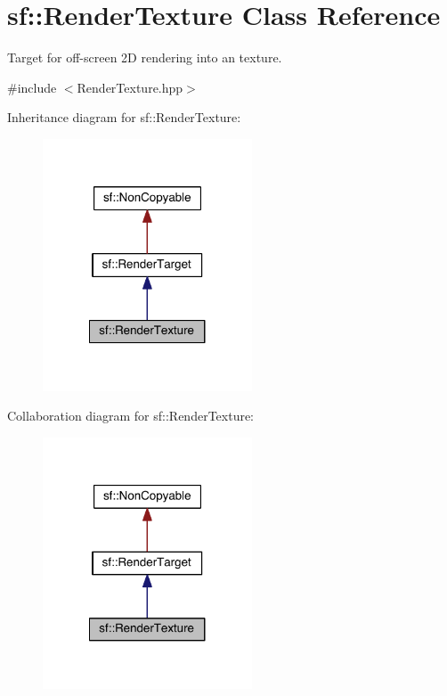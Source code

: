 \hypertarget{classsf_1_1_render_texture}{\section{sf\-:\-:Render\-Texture Class Reference}
\label{classsf_1_1_render_texture}
}


Target for off-\/screen 2\-D rendering into an texture.  




{\ttfamily \#include $<$Render\-Texture.\-hpp$>$}



Inheritance diagram for sf\-:\-:Render\-Texture\-:
\nopagebreak
\begin{figure}[H]
\begin{center}
\leavevmode
\includegraphics[width=176pt]{classsf_1_1_render_texture__inherit__graph}
\end{center}
\end{figure}


Collaboration diagram for sf\-:\-:Render\-Texture\-:
\nopagebreak
\begin{figure}[H]
\begin{center}
\leavevmode
\includegraphics[width=176pt]{classsf_1_1_render_texture__coll__graph}
\end{center}
\end{figure}
